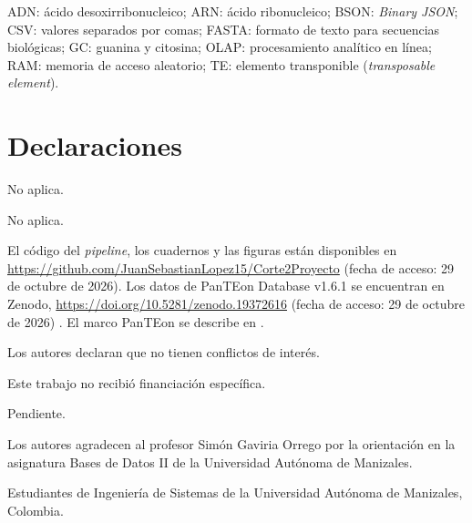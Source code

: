 \documentclass[pdflatex,lineno,referee,sn-vancouver-num]{sn-jnl}
\theoremstyle{thmstyleone}%
\theoremstyle{thmstyletwo}%
\theoremstyle{thmstylethree}%
\begin{document}
\noindent ADN: ácido desoxirribonucleico; ARN: ácido ribonucleico; BSON: \emph{Binary JSON}; CSV: valores separados por comas; FASTA: formato de texto para secuencias biológicas; GC: guanina y citosina; OLAP: procesamiento analítico en línea; RAM: memoria de acceso aleatorio; TE: elemento transponible (\emph{transposable element}).

\section*{Declaraciones}

 No aplica.

 No aplica.

 El código del \emph{pipeline}, los cuadernos y las figuras están disponibles en \url{https://github.com/JuanSebastianLopez15/Corte2Proyecto} (fecha de acceso: 29 de octubre de 2026). Los datos de PanTEon Database v1.6.1 se encuentran en Zenodo, \url{https://doi.org/10.5281/zenodo.19372616} (fecha de acceso: 29 de octubre de 2026) \cite{orozco2026panteondb}. El marco PanTEon se describe en \cite{orozco2026panteon}.

 Los autores declaran que no tienen conflictos de interés.

 Este trabajo no recibió financiación específica.

 Pendiente.

 Los autores agradecen al profesor Simón Gaviria Orrego por la orientación en la asignatura Bases de Datos II de la Universidad Autónoma de Manizales.

 Estudiantes de Ingeniería de Sistemas de la Universidad Autónoma de Manizales, Colombia.




\end{document}

